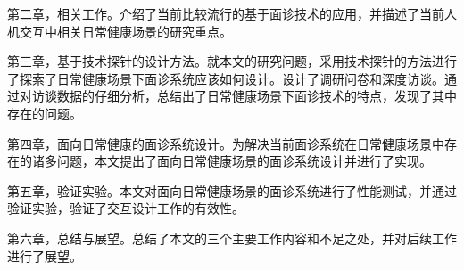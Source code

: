 第二章，相关工作。介绍了当前比较流行的基于面诊技术的应用，并描述了当前人机交互中相关日常健康场景的研究重点。

第三章，基于技术探针的设计方法。就本文的研究问题，采用技术探针的方法进行了探索了日常健康场景下面诊系统应该如何设计。设计了调研问卷和深度访谈。通过对访谈数据的仔细分析，总结出了日常健康场景下面诊技术的特点，发现了其中存在的问题。

第四章，面向日常健康的面诊系统设计。为解决当前面诊系统在日常健康场景中存在的诸多问题，本文提出了面向日常健康场景的面诊系统设计并进行了实现。

第五章，验证实验。本文对面向日常健康场景的面诊系统进行了性能测试，并通过验证实验，验证了交互设计工作的有效性。

第六章，总结与展望。总结了本文的三个主要工作内容和不足之处，并对后续工作进行了展望。